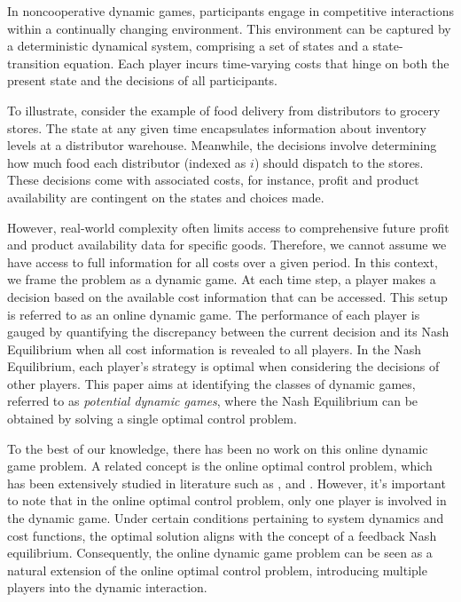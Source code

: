 \documentclass[letterpaper, 10 pt, conference]{ieeeconf}  %
\begin{document}
In noncooperative dynamic games, participants engage in competitive interactions within a continually changing environment. This environment can be captured by a deterministic dynamical system, comprising a set of states and a state-transition equation. Each player incurs time-varying costs that hinge on both the present state and the decisions of all participants.

To illustrate, consider the example of food delivery from distributors to grocery stores. The state at any given time encapsulates information about inventory levels at a distributor warehouse. Meanwhile, the decisions involve determining how much food each distributor (indexed as $i$) should dispatch to the stores. These decisions come with associated costs, for instance, profit and product availability are contingent on the states and choices made.

However, real-world complexity often limits access to comprehensive future profit and product availability data for specific goods. Therefore, we cannot assume we have access to full information for all costs over a given period. In this context, we frame the problem as a dynamic game. At each time step, a player makes a decision based on the available cost information that can be accessed. This setup is referred to as an online dynamic game. The performance of each player is gauged by quantifying the discrepancy between the current decision and its Nash Equilibrium when all cost information is revealed to all players. In the Nash Equilibrium, each player's strategy is optimal when considering the decisions of other players. This paper aims at identifying the classes of dynamic games, referred to as \emph{potential dynamic games}, where the Nash Equilibrium can be obtained by solving a single optimal control problem.

To the best of our knowledge, there has been no work on this online dynamic game problem. A related concept is the online optimal control problem, which has been extensively studied in literature such as \cite{zhang_regret_2021}, \cite{chen_regret_2023} and \cite{cohen_online_2018}. However, it's important to note that in the online optimal control problem, only one player is involved in the dynamic game. Under certain conditions pertaining to system dynamics and cost functions, the optimal solution aligns with the concept of a feedback Nash equilibrium. Consequently, the online dynamic game problem can be seen as a natural extension of the online optimal control problem, introducing multiple players into the dynamic interaction.
\end{document}
